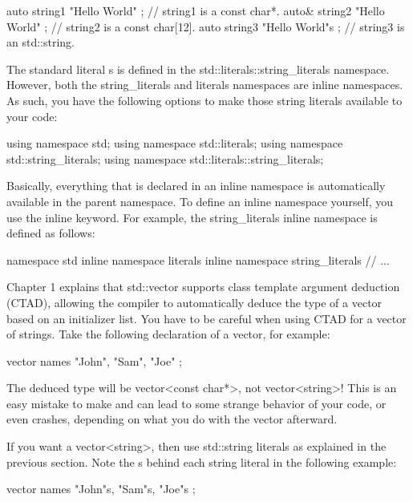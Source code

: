 \begin{cpp}
auto string1 { "Hello World" }; // string1 is a const char*.
auto& string2 { "Hello World" }; // string2 is a const char[12].
auto string3 { "Hello World"s }; // string3 is an std::string.
\end{cpp}

The standard literal s is defined in the std::literals::string\_literals namespace. However, both the string\_literals and literals namespaces are inline namespaces. As such, you have the following options to make those string literals available to your code:

\begin{cpp}
using namespace std;
using namespace std::literals;
using namespace std::string_literals;
using namespace std::literals::string_literals;
\end{cpp}

Basically, everything that is declared in an inline namespace is automatically available in the parent namespace. To define an inline namespace yourself, you use the inline keyword. For example, the string\_literals inline namespace is defined as follows:

\begin{cpp}
namespace std {
    inline namespace literals {
        inline namespace string_literals {
            // ...
        }
    }
}
\end{cpp}


Chapter 1 explains that std::vector supports class template argument deduction (CTAD), allowing the compiler to automatically deduce the type of a vector based on an initializer list. You have to be careful when using CTAD for a vector of strings. Take the following declaration of a vector, for example:

\begin{cpp}
vector names { "John", "Sam", "Joe" };
\end{cpp}

The deduced type will be vector<const char*>, not vector<string>! This is an easy mistake to make and can lead to some strange behavior of your code, or even crashes, depending on what you do with the vector afterward.

If you want a vector<string>, then use std::string literals as explained in the previous section. Note the s behind each string literal in the following example:

\begin{cpp}
vector names { "John"s, "Sam"s, "Joe"s };
\end{cpp}

